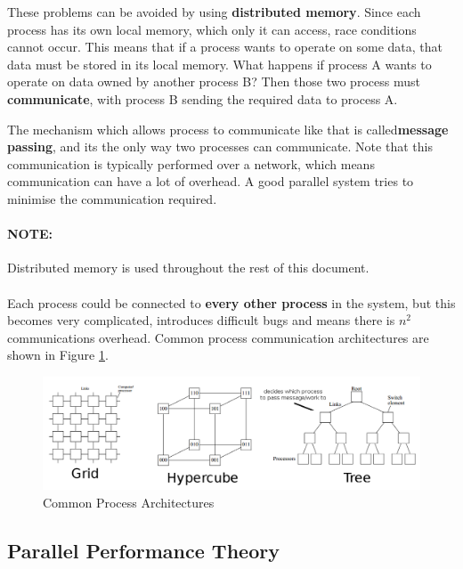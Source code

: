 \documentclass{article}
\begin{document}
These problems can be avoided by using \textbf{distributed memory}. Since each process has its own local memory, which only it can access, race conditions cannot occur. This means that if a process wants to operate on some data, that data must be stored in its local memory. What happens if process A wants to operate on data owned by another process B? Then those two process must \textbf{communicate}, with process B sending the required data to process A.

The mechanism which allows process to communicate like that is called\textbf{message passing}, and its the only way two processes can communicate. Note that this communication is typically performed over a network, which means communication can have a lot of overhead.  A good parallel system tries to minimise the communication required.

\paragraph{\textbf{NOTE:}} Distributed memory is used throughout the rest of this document.

\paragraph{}

Each process could be connected to \textbf{every other process} in the system, but this becomes very complicated, introduces difficult bugs and means there is $n^2$ communications overhead. Common process communication architectures are shown in Figure \ref{fig:common-process-architectures}.

\begin{figure}
	\centering
	\includegraphics[scale=0.4]{figures/distributed-architectures.png}
	\caption{Common Process Architectures}
	\label{fig:common-process-architectures}
\end{figure}

\subsection{Parallel Performance Theory}
\end{document}
